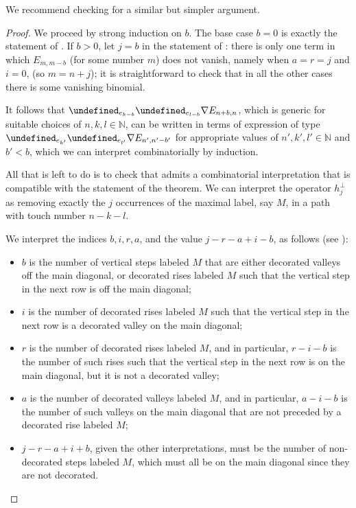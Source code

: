 \documentclass[reqno]{amsart}
\theoremstyle{plain}
\theoremstyle{definition}
\theoremstyle{remark}
\let\oldTheta\Theta
\let\Theta\undefined
\DeclareMathOperator{\Theta}{\oldTheta}
\newcommand{\<}{\langle}
\renewcommand{\>}{\rangle}
\begin{document}
We recommend checking \cite[Theorem~4.8]{IraciNadeauVandenWyngaerd2024Smirnov} for a similar but simpler argument.

\begin{proof}
    We proceed by strong induction on $b$. The base case $b=0$ is exactly the statement of 
    . If $b > 0$, let $j=b$ in the statement of : there is only one term in which $E_{m, m-b}$ (for some number $m$) does not vanish, namely when $a=r=j$ and $i=0$, (so $m=n+j$); it is straightforward to check that in all the other cases there is some vanishing binomial.
    
    It follows that $\Theta_{e_{k-b}} \Theta_{e_{l-b}} \nabla E_{n+b, n}$, which is generic for suitable choices of $n, k, l \in \mathbb{N}$, can be written in terms of expression of type $\Theta_{e_{k'}} \Theta_{e_{l'}} \nabla E_{n', n'-b'}$ for appropriate values of $n', k', l' \in \mathbb{N}$ and $b' < b$, which we can interpret combinatorially by induction.

    All that is left to do is to check that  admits a combinatorial interpretation that is compatible with the statement of the theorem. We can interpret the operator $h_j^\perp$ as removing exactly the $j$ occurrences of the maximal label, say $M$, in a path with touch number $n-k-l$.
    
    We interpret the indices $b, i, r, a$, and the value $j-r-a+i-b$, as follows (see ):
    \begin{itemize}
        \item $b$ is the number of vertical steps labeled $M$ that are either decorated valleys off the main diagonal, or decorated rises labeled $M$ such that the vertical step in the next row is off the main diagonal;
        \item $i$ is the number of decorated rises labeled $M$ such that the vertical step in the next row is a decorated valley on the main diagonal;
        \item $r$ is the number of decorated rises labeled $M$, and in particular, $r-i-b$ is the number of such rises such that the vertical step in the next row is on the main diagonal, but it is not a decorated valley;
        \item $a$ is the number of decorated valleys labeled $M$, and in particular, $a-i-b$ is the number of such valleys on the main diagonal that are not preceded by a decorated rise labeled $M$;
        \item $j-r-a+i+b$, given the other interpretations, must be the number of non-decorated steps labeled $M$, which must all be on the main diagonal since they are not decorated.
    \end{itemize}


\end{proof}
\end{document}
